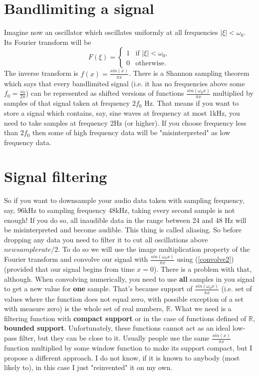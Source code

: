 \documentclass[a4paper,11pt,fleqn]{article}
\let\oldref\ref
\renewcommand{\ref}[1]{(\oldref{#1})}
\begin{document}
\section{Bandlimiting a signal}
Imagine now an oscillator which oscillates uniformly at all frequencies $\left|\xi\right| < \omega_{0}$. 
Its Fourier transform will be
\begin{equation}
\label{idealfilter}
F(\xi) = \left\{
\begin{array}{rl}
1 & \text{if } \left|\xi\right| < \omega_{0},\\
0 & \text{otherwise}.
\end{array} \right.
\end{equation}
The inverse transform is $f(x) = \frac{sin(x)}{\pi x}$. There is a Shannon sampling theorem which says that every
bandlimited signal (i.e. it has no frequencies above some $f_{0}=\frac{\omega_{0}}{2\pi}$) can be represented as 
shifted versions of functions $\frac{sin(\omega_{0}x)}{\pi x}$ multiplied by samples of that signal taken at frequency
$2f_{0}$ Hz. That means if you want to store a signal which contains, say, sine waves at frequency
at most 1kHz, you need to take samples at frequency 2Hz (or higher). If you choose frequency less than $2f_{0}$ then
some of high frequency data will be "misinterpreted" as low frequency data.
\section{Signal filtering}
So if you want to downsample your audio data taken with sampling frequency, say, 96kHz to sampling frequency 48kHz, taking
every second sample is not enough! If you do so, all inaudible data in the range between 24 and 48 Hz will be misinterpreted
and become audible. This thing is called aliasing. So before dropping any data you need to filter it to cut all oscillations
above $newsamplerate / 2$. To do so we will use the image multiplication property of the Fourier transform and convolve
our signal with $\frac{sin(\omega_{0}x)}{\pi x}$ using \ref{convolve2} (provided that our signal begins from time $x=0$). There is
a problem with that, although. When convolving numerically, you need to use \textbf{all} samples in you signal to get a new value
for \textbf{one} sample. That's because support of $\frac{sin(\omega_{0}x)}{\pi x}$ (i.e. set of values where the function does not equal
zero, with possible exception of a set with measure zero) is the whole set of real numbers, $\mathbb{R}$. What we need is a
filtering function with \textbf{compact support} or in the case of functions defined of $\mathbb{R}$, \textbf{bounded support}. 
Unfortunately, these functions cannot act as an ideal low-pass filter, but they can be close to it. Usually people use the same
$\frac{sin(x)}{\pi x}$ function multiplied by some window function to make its support compact, but I propose a different approach.
I do not know, if it is known to anybody (most likely to), in this case I just "reinvented" it on my own.
\end{document}

